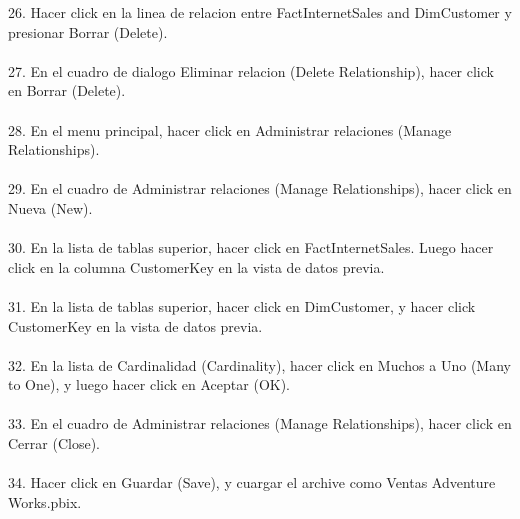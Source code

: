 \documentclass[12pt,letterpaper]{article}
\begin{document}
26. Hacer click en la linea de relacion entre FactInternetSales and DimCustomer y presionar Borrar (Delete).\\\\ 
27. En el cuadro de dialogo Eliminar relacion (Delete Relationship), hacer click en Borrar (Delete).\\\\ 
28. En el menu principal, hacer click en Administrar relaciones (Manage Relationships).\\\\ 
29. En el cuadro de Administrar relaciones (Manage Relationships), hacer click en Nueva (New).\\\\ 
30. En la lista de tablas superior, hacer click en FactInternetSales. Luego hacer click en la columna
CustomerKey en la vista de datos previa.\\\\ 
31. En la lista de tablas superior, hacer click en DimCustomer, y hacer click CustomerKey en la vista de datos
previa.\\\\ 
32. En la lista de Cardinalidad (Cardinality), hacer click en Muchos a Uno (Many to One), y luego hacer
click en Aceptar (OK).\\\\ 
33. En el cuadro de Administrar relaciones (Manage Relationships), hacer click en Cerrar (Close).\\\\ 
34. Hacer click en Guardar (Save), y cuargar el archive como Ventas Adventure Works.pbix.\\\\ 
\end{document}
